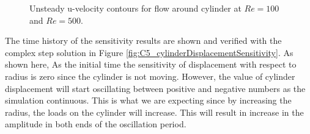 \begin{figure}[H]
    \quad
    \caption{Unsteady u-velocity contours for flow around cylinder at $Re = 100$ and $Re = 500$.}
    \label{fig:C5_cylinderFSIvelocity}
\end{figure}
%
The time history of the sensitivity results are shown and verified with the complex step solution in Figure \ref{fig:C5_cylinderDisplacementSensitivity}. As shown here, As the initial time the sensitivity of displacement with respect to radius is zero since the cylinder is not moving. However, the value of cylinder displacement will start oscillating between positive and negative numbers as the simulation continuous. This is what we are expecting since by increasing the radius, the loads on the cylinder will increase. This will result in increase in the amplitude in both ends of the oscillation period.
%
